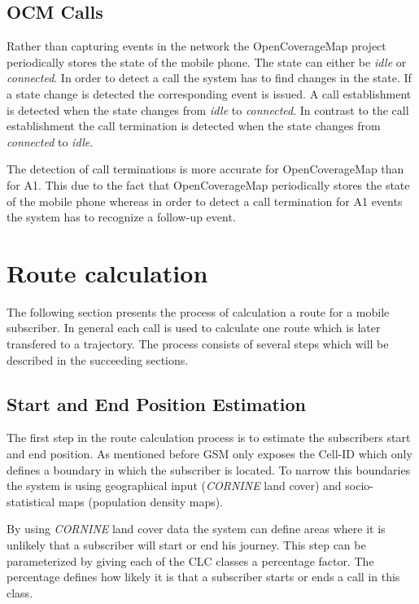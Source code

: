 \subsection{OCM Calls}
Rather than capturing events in the network the OpenCoverageMap project periodically stores the state of the mobile phone. The state can either be \emph{idle} or \emph{connected}. In order to detect a call the system has to find changes in the state. If a state change is detected the corresponding event is issued. A call establishment is detected when the state changes from \emph{idle} to \emph{connected}. In contrast to the call establishment the call termination is detected when the state changes from \emph{connected} to \emph{idle}. 

The detection of call terminations is more accurate for OpenCoverageMap than for A1. This due to the fact that OpenCoverageMap periodically stores the state of the mobile phone whereas in order to detect a call termination for A1 events the system has to recognize a follow-up event.

\section{Route calculation}
The following section presents the process of calculation a route for a mobile subscriber. In general each call is used to calculate one route which is later transfered to a trajectory. The process consists of several steps which will be described in the succeeding sections.  
\subsection{Start and End Position Estimation}
The first step in the route calculation process is to estimate the subscribers start and end position. As mentioned before GSM only exposes the Cell-ID which only defines a boundary in which the subscriber is located. To narrow this boundaries the system is using geographical input (\emph{CORNINE} land cover) and socio-statistical maps (population density maps). 

By using \emph{CORNINE} land cover data the system can define areas where it is unlikely that a subscriber will start or end his journey. This step can be parameterized by giving each of the CLC classes a percentage factor. The percentage defines how likely it is that a subscriber starts or ends a call in this class.

